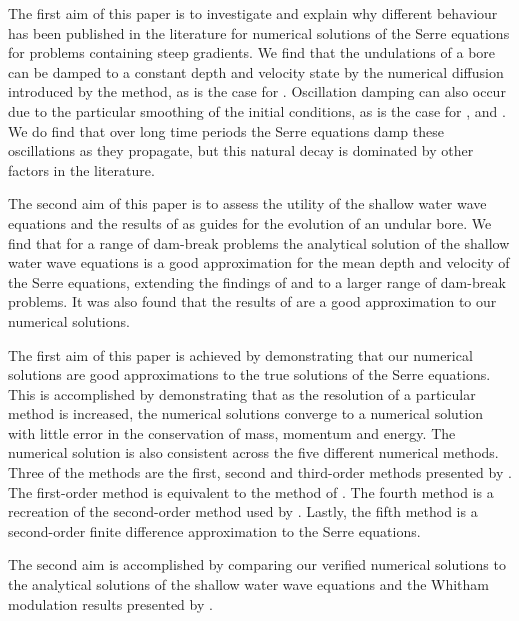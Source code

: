 \documentclass[times]{elsarticle}
\begin{document}
The first aim of this paper is to investigate and explain why different behaviour has been published in the literature for numerical solutions of the Serre equations for problems containing steep gradients. We find that the undulations of a bore can be damped to a constant depth and velocity state by the numerical diffusion introduced by the method, as is the case for \citet{Hank-etal-2010-2034}. Oscillation damping can also occur due to the particular smoothing of the initial conditions, as is the case for \citet{Mitsotakis-etal-2017}, \citet{El-etal-2006} and \citet{Mitsotakis-etal-2014}. We do find that over long time periods the Serre equations damp these oscillations as they propagate, but this natural decay is dominated by other factors in the literature.

The second aim of this paper is to assess the utility of the shallow water wave equations and the results of \citet{El-etal-2006} as guides for the evolution of an undular bore. We find that for a range of dam-break problems the analytical solution of the shallow water wave equations is a good approximation for the mean depth and velocity of the Serre equations, extending the findings of \citet{Hank-etal-2010-2034} and \citet{Mitsotakis-etal-2014} to a larger range of dam-break problems. It was also found that the results of \citet{El-etal-2006} are a good approximation to our numerical solutions.

The first aim of this paper is achieved by demonstrating that our numerical solutions are good approximations to the true solutions of the Serre equations. This is accomplished by demonstrating that as the resolution of a particular method is increased, the numerical solutions converge to a numerical solution with little error in the conservation of mass, momentum and energy. The numerical solution is also consistent across the five different numerical methods. Three of the methods are the first, second and third-order methods presented by \citet{Zoppou-etal-2017}. The first-order method is equivalent to the method of \citet{Hank-etal-2010-2034}. The fourth method is a recreation of the second-order method used by \citet{El-etal-2006}. Lastly, the fifth method is a second-order finite difference approximation to the Serre equations. 

The second aim is accomplished by comparing our verified numerical solutions to the analytical solutions of the shallow water wave equations and the Whitham modulation results presented by \citet{El-etal-2006}. 
 
\end{document}
